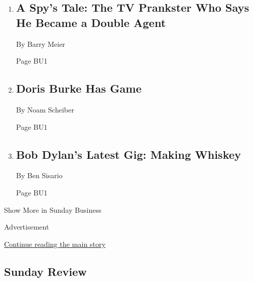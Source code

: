 \begin{enumerate}
\def\labelenumi{\arabic{enumi}.}
\item
  \href{/2018/04/27/business/corporate-spy-double-agent.html}{}

  \hypertarget{a-spys-tale-the-tv-prankster-who-says-he-became-a-double-agent-1}{%
  \subsection{A Spy's Tale: The TV Prankster Who Says He Became a Double
  Agent}\label{a-spys-tale-the-tv-prankster-who-says-he-became-a-double-agent-1}}

  By Barry Meier

  Page BU1
\item
  \href{/2018/04/28/business/doris-burke-nba.html}{}

  \hypertarget{doris-burke-has-game}{%
  \subsection{Doris Burke Has Game}\label{doris-burke-has-game}}

  By Noam Scheiber

  Page BU1
\item
  \href{/2018/04/28/business/media/bob-dylan-heavens-door.html}{}

  \hypertarget{bob-dylans-latest-gig-making-whiskey}{%
  \subsection{Bob Dylan's Latest Gig: Making
  Whiskey}\label{bob-dylans-latest-gig-making-whiskey}}

  By Ben Sisario

  Page BU1
\end{enumerate}

Show More in Sunday Business

Advertisement

\protect\hyperlink{after-mid4}{Continue reading the main story}

\hypertarget{sunday-review}{%
\subsection{Sunday Review}\label{sunday-review}}

